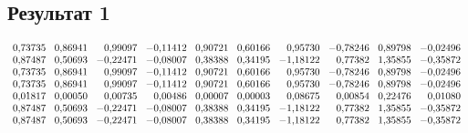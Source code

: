 \subsection{Результат 1}
\[
\normalsize
\begin{array}{r@{\hspace{0.3cm}}r@{\hspace{0.3cm}}r@{\hspace{0.3cm}}r@{\hspace{0.3cm}}r@{\hspace{0.3cm}}r@{\hspace{0.3cm}}r@{\hspace{0.3cm}}r@{\hspace{0.3cm}}r@{\hspace{0.3cm}}r}
0{,}73735 & 0{,}86941 & 0{,}99097 & -0{,}11412 & 0{,}90721 & 0{,}60166 & 0{,}95730 & -0{,}78246 & 0{,}89798 & -0{,}02496 \\ 
0{,}87487 & 0{,}50693 & -0{,}22471 & -0{,}08007 & 0{,}38388 & 0{,}34195 & -1{,}18122 & 0{,}77382 & 1{,}35855 & -0{,}35872 \\ 
0{,}73735 & 0{,}86941 & 0{,}99097 & -0{,}11412 & 0{,}90721 & 0{,}60166 & 0{,}95730 & -0{,}78246 & 0{,}89798 & -0{,}02496 \\ 
0{,}73735 & 0{,}86941 & 0{,}99097 & -0{,}11412 & 0{,}90721 & 0{,}60166 & 0{,}95730 & -0{,}78246 & 0{,}89798 & -0{,}02496 \\ 
0{,}01817 & 0{,}00050 & 0{,}00735 & 0{,}00486 & 0{,}00007 & 0{,}00003 & 0{,}08675 & 0{,}00854 & 0{,}22476 & 0{,}01080 \\ 0{,}87487 & 0{,}50693 & -0{,}22471 & -0{,}08007 & 0{,}38388 & 0{,}34195 & -1{,}18122 & 0{,}77382 & 1{,}35855 & -0{,}35872 \\ 
0{,}87487 & 0{,}50693 & -0{,}22471 & -0{,}08007 & 0{,}38388 & 0{,}34195 & -1{,}18122 & 0{,}77382 & 1{,}35855 & -0{,}35872
\end{array}
\]
